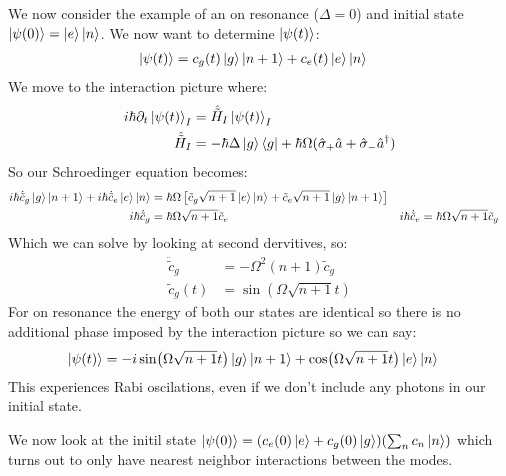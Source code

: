 We now consider the example of an on resonance ($\Delta=0$) and initial state $\ket{\psi(0)} = \ket{e}\ket{n}$. We now want to determine $\ket{\psi(t)}$:
\begin{align*}
	\ket{\psi(t)} &= c_g(t) \ket{g}\ket{n+1} + c_e(t)\ket{e}\ket{n}
\end{align*}
We move to the interaction picture where:
\begin{align*}
	i\hbar\partial_t\ket{\psi(t)}_I &= \hat{\tilde{H}}_I\ket{\psi(t)}_I \\
	\hat{\tilde{H}}_I &= -\hbar\Delta\ket{g}\bra{g} + \hbar\Omega(\hat{\sigma}_+\hat{a} + \hat{\sigma}_-\hat{a}^\dagger)
\end{align*}
So our Schroedinger equation becomes:
\begin{align*}
	i\hbar \dot{\tilde{c}}_g\ket{g}\ket{n+1} + i\hbar\dot{\tilde{c}}_e\ket{e}\ket{n} &= \hbar\Omega\left[\tilde{c}_g\sqrt{n+1}\ket{e}\ket{n} + \tilde{c}_e\sqrt{n+1}\ket{g}\ket{n+1}\right] \\
	i\hbar\dot{\tilde{c}}_g &= \hbar\Omega\sqrt{n+1}\tilde{c}_e & i\hbar\dot{\tilde{c}}_e &= \hbar\Omega\sqrt{n+1}\tilde{c}_g
\end{align*}
Which we can solve by looking at second dervitives, so:
\begin{align*}
	\ddot{\tilde{c}}_g &= -\Omega^2(n+1)\tilde{c}_g \\
	\tilde{c}_g(t) &= \sin(\Omega\sqrt{n+1}t)
\end{align*}
For on resonance the energy of both our states are identical so there is no additional phase imposed by the interaction picture so we can say:
\begin{align*}
	\ket{\psi(t)} &= -i\sin(\Omega\sqrt{n+1}t)\ket{g}\ket{n+1} +\cos(\Omega\sqrt{n+1}t)\ket{e}\ket{n}
\end{align*}
This experiences Rabi oscilations, even if we don't include any photons in our initial state.

We now look at the initil state $\ket{\psi(0)} = (c_e(0)\ket{e} + c_g(0)\ket{g})(\sum_n c_n\ket{n})$ which turns out to only have nearest neighbor interactions between the modes.

